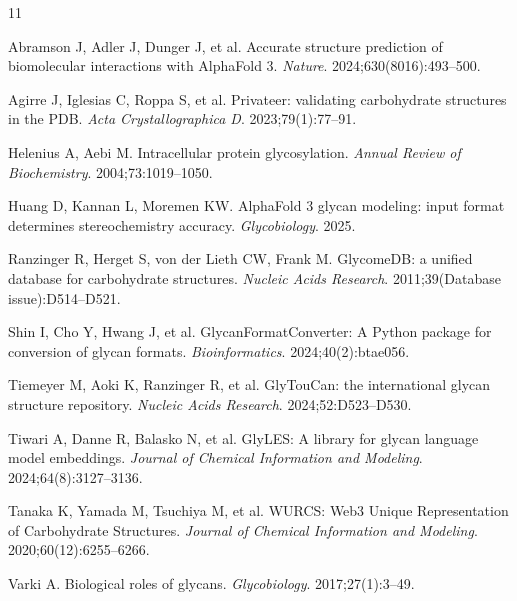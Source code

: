 \documentclass[11pt,a4paper]{article}
\begin{document}
\begin{thebibliography}{11}

 Abramson J, Adler J, Dunger J, et al. Accurate structure prediction of biomolecular interactions with AlphaFold 3. \textit{Nature}. 2024;630(8016):493--500.

 Agirre J, Iglesias C, Roppa S, et al. Privateer: validating carbohydrate structures in the PDB. \textit{Acta Crystallographica D}. 2023;79(1):77--91.

 Helenius A, Aebi M. Intracellular protein glycosylation. \textit{Annual Review of Biochemistry}. 2004;73:1019--1050.

 Huang D, Kannan L, Moremen KW. AlphaFold 3 glycan modeling: input format determines stereochemistry accuracy. \textit{Glycobiology}. 2025.

 Ranzinger R, Herget S, von der Lieth CW, Frank M. GlycomeDB: a unified database for carbohydrate structures. \textit{Nucleic Acids Research}. 2011;39(Database issue):D514--D521.

 Shin I, Cho Y, Hwang J, et al. GlycanFormatConverter: A Python package for conversion of glycan formats. \textit{Bioinformatics}. 2024;40(2):btae056.

 Tiemeyer M, Aoki K, Ranzinger R, et al. GlyTouCan: the international glycan structure repository. \textit{Nucleic Acids Research}. 2024;52:D523--D530.

 Tiwari A, Danne R, Balasko N, et al. GlyLES: A library for glycan language model embeddings. \textit{Journal of Chemical Information and Modeling}. 2024;64(8):3127--3136.

 Tanaka K, Yamada M, Tsuchiya M, et al. WURCS: Web3 Unique Representation of Carbohydrate Structures. \textit{Journal of Chemical Information and Modeling}. 2020;60(12):6255--6266.

 Varki A. Biological roles of glycans. \textit{Glycobiology}. 2017;27(1):3--49.

\end{thebibliography}
\end{document}
